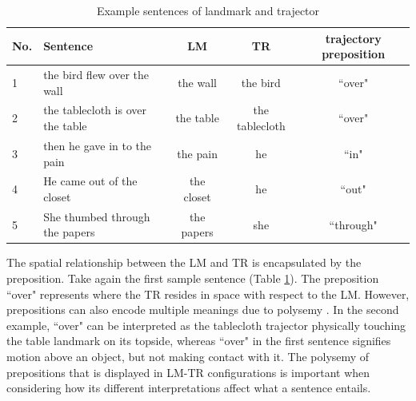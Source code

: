 \documentclass[12pt,letterpaper]{article}
\begin{document}
\begin{table}[h]
\centering
    \begin{tabularx}{\textwidth}{l X c c c}
    \toprule
    No. & Sentence & LM & TR & trajectory preposition \\
    \midrule
    1  & the bird flew over the wall & the wall & the bird & ``over" \\ %
    2  & the tablecloth is over the table & the table & the tablecloth & ``over"\\ %
    3  & then he gave in to the pain & the pain & he & ``in" \\  %
    4  & He came out of the closet & the closet & he & ``out" \\  %
    5  & She thumbed through the papers & the papers & she & ``through" \\   %
 

   
    \bottomrule
    \end{tabularx}
\caption{Example sentences of landmark and trajector}
\label{t:examples}
\end{table}





The spatial relationship between the LM and TR is encapsulated by the preposition. Take again the first sample sentence (Table \ref{t:examples}). The preposition ``over" represents where the TR resides in space with respect to the LM. However, prepositions can also encode multiple meanings due to polysemy  \citep[pp.~342--345]{evans_green_cogling_2006}. In the second example, ``over" can be interpreted as the tablecloth trajector physically touching the table landmark on its topside, whereas ``over" in the first sentence signifies motion above an object, but not making contact with it. The polysemy of prepositions that is displayed in LM-TR configurations is important when considering how its different interpretations affect what a sentence entails.
\end{document}
